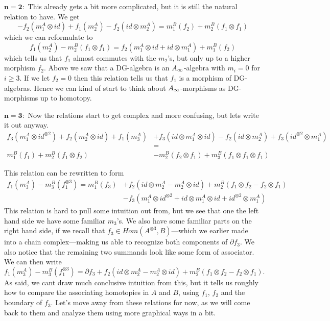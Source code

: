 $\mathbf{n=2:}$ This already gets a bit more complicated, but it is still the natural relation to have. We get
\begin{equation*}
    -f_2(m_1^A\otimes id)+f_1(m_2^A)-f_2(id\otimes m_2^A) = m_1^B(f_2)+m_2^B(f_1\otimes f_1)
\end{equation*}
which we can reformulate to 
\begin{equation*}
    f_1(m_2^A)-m_2^B(f_1\otimes f_1) = f_2(m_1^A\otimes id + id\otimes m_1^A) + m_1^B(f_2)
\end{equation*}
which tells us that $f_1$ almost commutes with the $m_2$'s, but only up to a higher morphism $f_2$. Above we saw that a DG-algebra is an $A_{\infty}$-algebra with $m_i=0$ for $i\geq 3$. If we let $f_2=0$ then this relation tells us that $f_1$ is a morphism of DG-algebras. Hence we can kind of start to think about $A_{\infty}$-morphisms as DG-morphisms up to homotopy.  

$\mathbf{n=3:}$ Now the relations start to get complex and more confusing, but lets write it out anyway. 
\begin{align*}
    f_3(m_1^A\otimes id^{\otimes 2})
    +f_2(m_2^A\otimes id)
    +f_1(m_3^A)
    &+f_3(id\otimes m_1^A\otimes id)
    -f_2(id\otimes m_2^A)
    +f_3(id^{\otimes 2}\otimes m_1^A) \\
    &= \\
    m_1^B(f_1)
    +m_2^B(f_1\otimes f_2) 
    &-m_2^B(f_2\otimes f_1)
    +m_3^B(f_1\otimes f_1\otimes f_1)
\end{align*}

This relation can be rewritten to form 
\begin{align*}
    f_1(m_3^A)
    -m_3^B(f_1^{\otimes 3})
    = 
    m_1^B(f_3)
    &+f_2(id\otimes m_2^A-m_2^A\otimes id)
    +m_2^B(f_1\otimes f_2 - f_2\otimes f_1) \\
    &-f_3(m_1^A\otimes id^{\otimes 2}+id\otimes m_1^A\otimes id+id^{\otimes 2}\otimes m_1^A)
\end{align*}
This relation is hard to pull some intuition out from, but we see that one the left hand side we have some familiar $m_3$'s. We also have some familiar parts on the right hand side, if we recall that $f_3\in Hom(A^{\otimes 3}, B)$---which we earlier made into a chain complex---making us able to recognize both components of $\partial f_3$. We also notice that the remaining two summands look like some form of associator. We can then write
\begin{equation*}
    f_1(m_3^A)-m_3^B(f_1^{\otimes 3}) = \partial f_3 + f_2(id\otimes m_2^A-m_2^A\otimes id)
    +m_2^B(f_1\otimes f_2 - f_2\otimes f_1).
\end{equation*}
As said, we cant draw much conclusive intuition from this, but it tells us roughly how to compare the associating homotopies in $A$ and $B$, using $f_1$, $f_2$ and the boundary of $f_3$. Let's move away from these relations for now, as we will come back to them and analyze them using more graphical ways in a bit. 

